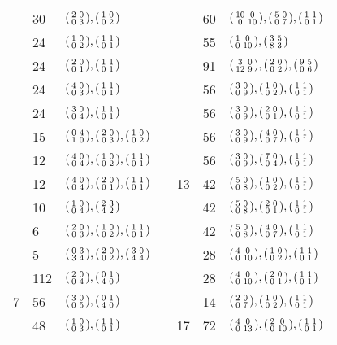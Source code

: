 \documentclass[table,dvipsnames]{amsart}
\newcommand{\smallmat}[4]{\begin{psmallmatrix}#1&#2\\#3&#4\end{psmallmatrix}}
\numberwithin{equation}{section}
\begin{document}
\begin{table}
\begin{tabular}{lllclll}
 & 30 & $\smallmat{2}{0}{0}{3},\smallmat{1}{0}{0}{2}$ & & & 60 & $\smallmat{10}{0}{0}{10},\smallmat{5}{0}{0}{7},\smallmat{1}{1}{0}{1}$ \\
 & 24 & $\smallmat{1}{0}{0}{2},\smallmat{1}{1}{0}{1}$ & & & 55 & $\smallmat{1}{0}{0}{10},\smallmat{3}{5}{8}{3}$ \\\cmidrule{5-7}
 & 24 & $\smallmat{2}{0}{0}{1},\smallmat{1}{1}{0}{1}$ & & \multirow{11}{*}{13} & 91 & $\smallmat{3}{0}{12}{9},\smallmat{2}{0}{0}{2},\smallmat{9}{5}{0}{6}$ \\
 & 24 & $\smallmat{4}{0}{0}{3},\smallmat{1}{1}{0}{1}$ & &  & 56 & $\smallmat{3}{0}{0}{9},\smallmat{1}{0}{0}{2},\smallmat{1}{1}{0}{1}$ \\
 & 24 & $\smallmat{3}{0}{0}{4},\smallmat{1}{1}{0}{1}$ & &  & 56 & $\smallmat{3}{0}{0}{9},\smallmat{2}{0}{0}{1},\smallmat{1}{1}{0}{1}$ \\
 & 15 & $\smallmat{0}{4}{1}{0},\smallmat{2}{0}{0}{3},\smallmat{1}{0}{0}{2}$ & &  & 56 & $\smallmat{3}{0}{0}{9},\smallmat{4}{0}{0}{7},\smallmat{1}{1}{0}{1}$ \\
 & 12 & $\smallmat{4}{0}{0}{4},\smallmat{1}{0}{0}{2},\smallmat{1}{1}{0}{1}$ & &  & 56 & $\smallmat{3}{0}{0}{9},\smallmat{7}{0}{0}{4},\smallmat{1}{1}{0}{1}$ \\
 & 12 & $\smallmat{4}{0}{0}{4},\smallmat{2}{0}{0}{1},\smallmat{1}{1}{0}{1}$ & &  & 42 & $\smallmat{5}{0}{0}{8},\smallmat{1}{0}{0}{2},\smallmat{1}{1}{0}{1}$ \\
 & 10 & $\smallmat{1}{0}{0}{4},\smallmat{2}{3}{4}{2}$ & &  & 42 & $\smallmat{5}{0}{0}{8},\smallmat{2}{0}{0}{1},\smallmat{1}{1}{0}{1}$ \\
 & 6 & $\smallmat{2}{0}{0}{3},\smallmat{1}{0}{0}{2},\smallmat{1}{1}{0}{1}$ & &  & 42 & $\smallmat{5}{0}{0}{8},\smallmat{4}{0}{0}{7},\smallmat{1}{1}{0}{1}$ \\
 & 5 & $\smallmat{0}{3}{3}{4},\smallmat{2}{0}{0}{2},\smallmat{3}{0}{4}{4}$ & &  & 28 & $\smallmat{4}{0}{0}{10},\smallmat{1}{0}{0}{2},\smallmat{1}{1}{0}{1}$ \\\cmidrule{1-3}
\multirow{7}{*}{7} & 112 & $\smallmat{2}{0}{0}{4},\smallmat{0}{1}{4}{0}$ & &  & 28 & $\smallmat{4}{0}{0}{10},\smallmat{2}{0}{0}{1},\smallmat{1}{1}{0}{1}$ \\
 & 56 & $\smallmat{3}{0}{0}{5},\smallmat{0}{1}{4}{0}$ & & & 14 & $\smallmat{2}{0}{0}{7},\smallmat{1}{0}{0}{2},\smallmat{1}{1}{0}{1}$ \\\cmidrule{5-7}
 & 48 & $\smallmat{1}{0}{0}{3},\smallmat{1}{1}{0}{1}$ & & \multirow{2}{*}{17} & 72 & $\smallmat{4}{0}{0}{13},\smallmat{2}{0}{0}{10},\smallmat{1}{1}{0}{1}$ \\

\end{tabular}
\end{table}
\end{document}
